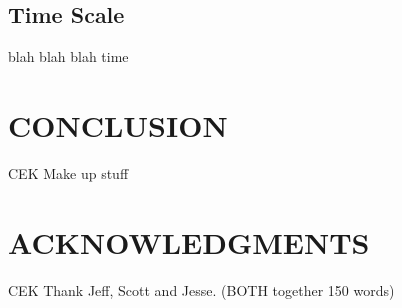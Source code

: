 \documentclass{article}
\begin{document}
\subsection{Time Scale}
blah blah blah time

\section{CONCLUSION}
CEK Make up stuff

\section{ACKNOWLEDGMENTS} 
CEK Thank Jeff, Scott and Jesse.
(BOTH together 150 words)





\end{document}
